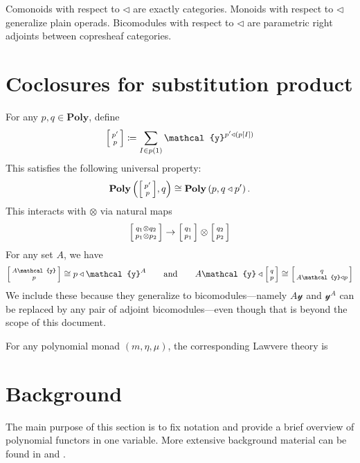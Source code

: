 \documentclass[11pt, one side, article]{memoir}
\makeatletter
\theoremstyle{definition}
\theoremstyle{plain}
\newcommand{\Cat}[1]{\mathbf{#1}}%
\newcommand{\yon}{\mathcal{y}}
\newcommand{\poly}{\Cat{Poly}}
\newcommand{\0}{\textsf{0}}
\newcommand{\1}{\tn{\textsf{1}}}
\newcommand{\tri}{\mathbin{\triangleleft}}
\newcommand{\bigcocl}[2]{
     \begin{bmatrix}{\vphantom{f_f^f}#2} \\ {\vphantom{f_f^f}#1} \end{bmatrix}
}
\newcommand{\littlecocl}[2]{
     \begin{bsmallmatrix}{\vphantom{f}#2} \\ {\vphantom{f}#1} \end{bsmallmatrix}
}
\newcommand{\cocl}[2]{
  \relax\if@display
     \bigcocl{#1}{#2}
  \else
     \littlecocl{#1}{#2}
  \fi
}
\newcommand{\qqand}{\qquad\text{and}\qquad}
\makeatother
\begin{document}
Comonoids with respect to $\tri$ are exactly categories. Monoids with respect to $\tri$ generalize plain operads. Bicomodules with respect to $\tri$ are parametric right adjoints between copresheaf categories.


\chapter{Coclosures for substitution product}

For any $p,q\in\poly$, define
\begin{equation}
\cocl{p}{p'}\coloneqq\sum_{I\in p(1)}\yon^{p'\tri (p[I])}
\end{equation}
This satisfies the following universal property:
\begin{equation}
	\poly\left(\cocl{p}{p'},q\right)\cong\poly\left(p,q\tri p'\right).
\end{equation}
This interacts with $\otimes$ via natural maps
\begin{equation}
	\cocl{p_1\otimes p_2}{q_1\otimes q_2}\to\cocl{p_1}{q_1}\otimes\cocl{p_2}{q_2}
\end{equation}
For any set $A$, we have
\begin{equation}
  \cocl{p}{A\yon}\cong p\tri\yon^A
  \qqand
  A\yon\tri\cocl{p}{q}\cong\cocl{A\yon\tri p}{q}
\end{equation}
We include these because they generalize to bicomodules---namely $A\yon$ and $\yon^A$ can be replaced by any pair of adjoint bicomodules---even though that is beyond the scope of this document.



For any polynomial monad $(m,\eta,\mu)$, the corresponding Lawvere theory is

\clearpage\appendix
\chapter{Background}\label{chap.background}


The main purpose of this section is to fix notation and provide a brief overview of polynomial functors in one variable. More extensive background material can be found in \cite{spivak2022poly} and \cite{kock2012polynomial}. 
\end{document}
